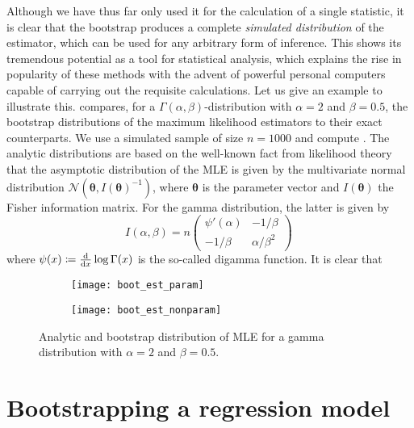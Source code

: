 \documentclass[a4paper]{book}
\begin{document}
Although we have thus far only used it for the calculation of a single statistic, it is clear that the bootstrap produces a complete \emph{simulated distribution} of the estimator, which can be used for any arbitrary form of inference. This shows its tremendous potential as a tool for statistical analysis, which explains the rise in popularity of these methods with the advent of powerful personal computers capable of carrying out the requisite calculations. Let us give an example to illustrate this.  compares, for a $\Gamma(\alpha, \beta)$-distribution with $\alpha = 2$ and $\beta = 0.5$, the bootstrap distributions of the maximum likelihood estimators to their exact counterparts. We use a simulated sample of size $n = 1000$ and compute . The analytic distributions are based on the well-known fact from likelihood theory that the asymptotic distribution of the MLE is given by the multivariate normal distribution $\mathcal{N}(\bm{\theta}, I(\bm{\theta})^{-1})$, where $\bm{\theta}$ is the parameter vector and $I(\bm{\theta})$ the Fisher information matrix. For the gamma distribution, the latter is given by
\begin{equation}
  I(\alpha, \beta) = n
  \begin{pmatrix}
      \psi'(\alpha) & -1 / \beta \\
      -1 / \beta & \alpha / \beta^2
  \end{pmatrix} \,
\end{equation}
where $\psi(x) \coloneqq \odv{}{x} \log \Gamma(x)$ is the so-called digamma function. It is clear that 

\begin{landscape}
  \begin{figure}
    \begin{subfigure}{\linewidth}
      \texttt{[image: boot\_est\_param]}
    \end{subfigure}
    \begin{subfigure}{\linewidth}
      \texttt{[image: boot\_est\_nonparam]}
    \end{subfigure}
    \caption{Analytic and bootstrap distribution of MLE for a gamma distribution with $\alpha = 2$ and $\beta = 0.5$.}
    \label{fig:boot-est}
  \end{figure}
\end{landscape}

\section{Bootstrapping a regression model} \label{sec:boot-reg}
\end{document}

